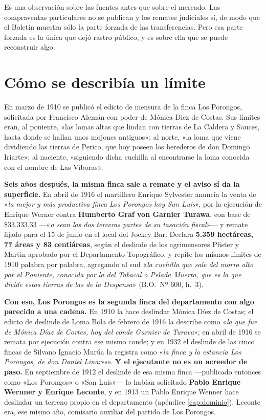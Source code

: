 Es una observación sobre las fuentes antes que sobre el mercado. Las compraventas
particulares no se publican y los remates judiciales sí, de modo que el Boletín muestra
sólo la parte forzada de las transferencias. Pero esa parte forzada es la única que dejó
rastro público, y es sobre ella que se puede reconstruir algo.

\section{Cómo se describía un límite}

En marzo de 1910 se publicó el edicto de mensura de la finca Los Porongos, solicitada por
Francisco Alemán con poder de Mónica Diez de Costas. Sus límites eran, al poniente, «las
lomas altas que lindan con tierras de La Caldera y Sauces, hasta donde se hallan unos
mojones antiguos»; al norte, «la loma que viene dividiendo las tierras de Perico, que hoy
poseen los herederos de don Domingo Iriarte»; al naciente, «siguiendo dicha cuchilla al
encontrarse la loma conocida con el nombre de Las Víboras».

\textbf{Seis años después, la misma finca sale a remate y el aviso sí da la superficie.} En abril
de 1916 el martillero Enrique Sylvester anuncia la venta de «\textit{la mejor y más productiva finca
Los Porongos hoy San Luis}», por la ejecución de Enrique Werner contra \textbf{Humberto Graf von
Garnier Turawa}, con base de \$33.333,33 ---«\textit{o sean las dos terceras partes de su tasación
fiscal}»--- y remate fijado para el 15 de junio en el local del Jockey Bar. Declara
\textbf{5.359 hectáreas, 77 áreas y 83 centiáreas}, según el deslinde de los agrimensores Pfister y
Martin aprobado por el Departamento Topográfico, y repite los mismos límites de 1910 palabra por
palabra, agregando al sud «\textit{la cuchilla que sale del morro alto por el Poniente, conocida por
la del Tabacal o Pelada Muerta, que es la que divide estas tierras de las de la Despensa}» (B.O.\
Nº 600, h.\ 3).

\textbf{Con eso, Los Porongos es la segunda finca del departamento con algo parecido a una cadena.}
En 1910 la hace deslindar Mónica Díez de Costas; el edicto de deslinde de Loma Bola de febrero de
1916 la describe como «\textit{la que fue de Mónica Díaz de Cortes, hoy del conde Garnier de
Turava}»; en abril de 1916 se remata por ejecución contra ese mismo conde; y en 1932 el deslinde de
las cinco fincas de Silvano Ignacio Murúa\index{Murúa, Silvano Ignacio} la registra como «\textit{la
finca y la estancia Los Porongos, de don Daniel Linares}»\index{Linares, Daniel}. \textbf{Y el ejecutante no es un acreedor de paso.} En septiembre de 1912 el deslinde de esa misma
finca ---publicado entonces como «Los Porongos» o «San Luis»--- lo habían solicitado
\textbf{Pablo Enrique Wernner y Enrique Leconte}, y en 1913 un Pablo Enrique Wenner hace deslindar un
terreno propio en el departamento (apéndice \ref{cap:dominio}). Leconte era, ese mismo año, comisario
auxiliar del partido de Los Porongos.

